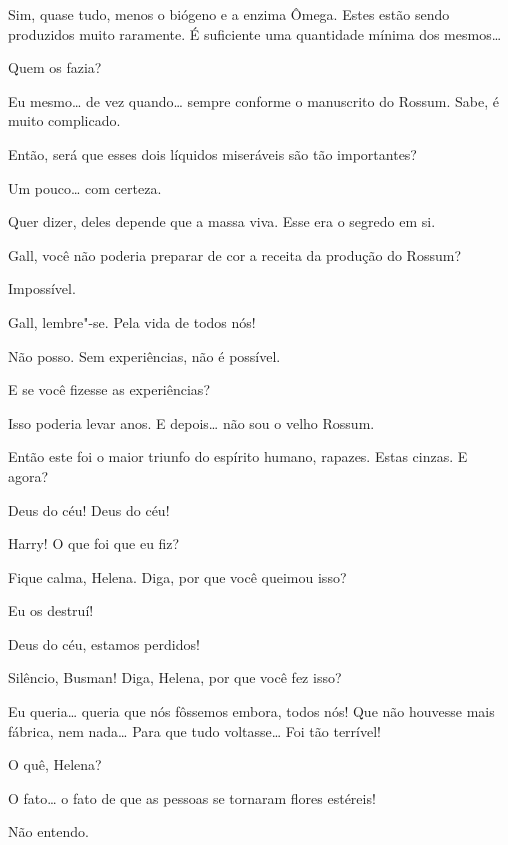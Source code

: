  Sim, quase tudo, menos o biógeno e a enzima Ômega. Estes estão sendo
produzidos muito raramente. É suficiente uma quantidade mínima dos mesmos\ldots{}

 Quem os fazia?

 Eu mesmo\ldots{} de vez quando\ldots{} sempre conforme o manuscrito do
Rossum. Sabe, é muito complicado.

 Então, será que esses dois líquidos miseráveis são tão importantes?

 Um pouco\ldots{} com certeza.

 Quer dizer, deles depende que a massa viva. Esse era o segredo em si.

 Gall, você não poderia preparar de cor a receita da produção do Rossum?

 Impossível.

 Gall, lembre"-se. Pela vida de todos nós!

 Não posso. Sem experiências, não é possível.

 E se você fizesse as experiências?

 Isso poderia levar anos. E depois\ldots{} não sou o velho Rossum.

  Então este foi o maior triunfo
do espírito humano, rapazes. Estas cinzas.  E agora?

  Deus do céu! Deus do céu!

  Harry! O que foi que eu fiz?

 Fique calma, Helena. Diga, por que você queimou isso?

 Eu os destruí!

 Deus do céu, estamos perdidos!

 Silêncio, Busman! Diga, Helena, por que você fez isso?

 Eu queria\ldots{} queria que nós fôssemos embora, todos nós! Que não
houvesse mais fábrica, nem nada\ldots{} Para que tudo voltasse\ldots{} Foi tão
terrível!

 O quê, Helena?

 O fato\ldots{} o fato de que as pessoas se tornaram flores estéreis!

 Não entendo.


